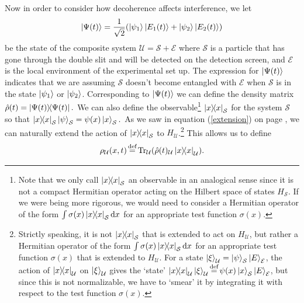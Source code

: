     Now in order to consider how decoherence affects interference, we let $$\ket{\Psi(t)}=\frac{1}{\sqrt{2}}(\ket{\psi_1}\ket{E_1(t)}+\ket{\psi_2}\ket{E_2(t)})$$ be the state of the composite system $\mathcal{U}=\mathcal{S}+\mathcal{E}$ where $\mathcal{S}$ is a particle that has gone through the double slit and will be detected on the detection screen, and $\mathcal{E}$ is the local environment of the experimental set up. The expression for $\ket{\Psi(t)}$ indicates that we are assuming  $\mathcal{S}$ doesn't become entangled with $\mathcal{E}$ when $\mathcal{S}$ is in the state $\ket{\psi_1}$ or $\ket{\psi_2}$. Corresponding to $\ket{\Psi(t)}$ we can define the density matrix  $\hat{\rho}(t)=\dyad{\Psi(t)}.$  We can also define the observable\footnote{Note that we only call $\dyad{x}_\mathcal{S}$ an observable in an analogical sense since it is not a compact Hermitian operator acting on the Hilbert space of states $H_\mathcal{S}$. If we were being more rigorous, we would need to consider a Hermitian operator of the form $\int \sigma(x)\dyad{x}_\mathcal{S}\dd x$ for an appropriate test function $\sigma(x)$. } $\dyad{x}_\mathcal{S}$ for the system $\mathcal{S}$ so that $\dyad{x}_\mathcal{S}\ket{\psi}_\mathcal{S}=\psi(x)\ket{x}_\mathcal{S}.$ As we saw in equation (\ref{extension}) on page \pageref{extension}, we can naturally extend the action of $\dyad{x}_\mathcal{S}$ to $H_\mathcal{U}$.\footnote{Strictly speaking, it is not $\dyad{x}_\mathcal{S}$ that is extended to act on $H_\mathcal{U}$, but rather a Hermitian operator of the form $\int \sigma(x)\dyad{x}_\mathcal{S}\dd x$ for an appropriate test function $\sigma(x)$ that is extended to $H_\mathcal{U}$. For a state $\ket{\xi}_\mathcal{U}=\ket{\psi}_\mathcal{S}\ket{E}_\mathcal{E}$, the action of $\dyad{x}_\mathcal{U}$ on $\ket{\xi}_\mathcal{U}$ gives the `state' $\dyad{x}_\mathcal{U}\ket{\xi}_\mathcal{U}\myeq\psi(x)\ket{x}_\mathcal{S}\ket{E}_\mathcal{E}$, but since this is not normalizable, we have to `smear' it by integrating it with respect to the test function $\sigma(x)$.}  
    This allows us to define 
    $$\rho_\mathcal{U}(x, t)\myeq\Tr_\mathcal{U}(\hat{\rho}(t)_\mathcal{U}\dyad{x}_\mathcal{U}).$$
